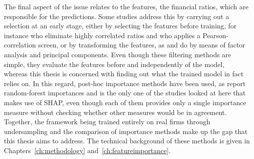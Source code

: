 The final aspect of the issue relates to the features, the financial ratios,
which are responsible for the predictions. Some studies address this by carrying
out a selection at an early stage, either by selecting the features before
training, for instance \textcite{veganzones2018} who eliminate highly correlated
ratios and \textcite{chaudhary2023} who applies a Pearson-correlation screen, or
by transforming the features, as \textcite{ko2024} and \textcite{sinap2025} do
by means of factor analysis and principal components. Even though these
filtering methods are simple, they evaluate the features before and
independently of the model, whereas this thesis is concerned with finding
out what the trained model in fact relies on. In this regard, post-hoc
importance methods have been used, as \textcite{ansahnarh2024} report
random-forest importances and \textcite{sinap2025} is the only one of the
studies looked at here that makes use of SHAP, even though each of them provides
only a single importance measure without checking whether other measures would
be in agreement. Together, the framework being trained entirely on real firms
through undersampling and the comparison of importance methods make up the gap that 
this thesis aims to address. The technical
background of these methods is given in
Chapters~\ref{ch:methodology} and~\ref{ch:featureimportance}.


